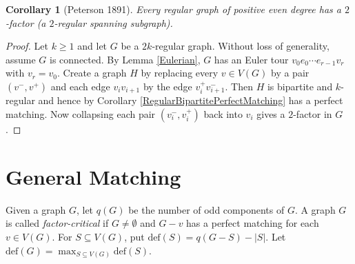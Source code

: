 \documentclass[12pt]{article}
\theoremstyle{plain}
\newtheorem{cor}[thm]{Corollary}
\theoremstyle{definition}
\theoremstyle{remark}
\newcommand{\card}[1]{\left|#1\right|}
\newcommand{\defic}[1]{\text{def}(#1)}
\begin{document}
\begin{cor}[Peterson 1891]
Every regular graph of positive even degree has a $2$-factor (a $2$-regular spanning subgraph).
\end{cor}
\begin{proof}
Let $k \geq 1$ and let $G$ be a $2k$-regular graph.  Without loss of generality, assume $G$ is connected.  By Lemma \ref{Eulerian}, $G$ has an Euler tour $v_0e_0\cdots e_{r-1}v_{r}$ with $v_r = v_0$.  Create a graph $H$ by replacing every $v \in V(G)$ by a pair $(v^-, v^+)$ and each edge $v_iv_{i+1}$ by the edge $v_i^+v_{i+1}^-$.  Then $H$ is bipartite and $k$-regular and hence by Corollary \ref{RegularBipartitePerfectMatching} has a perfect matching.  Now collapsing each pair $(v_i^-, v_i^+)$ back into $v_i$ gives a $2$-factor in $G$.
\end{proof}

\section{General Matching}
Given a graph $G$, let $q(G)$ be the number of odd components of $G$.  A graph $G$ is called \emph{factor-critical} if $G \neq \emptyset$ and $G-v$ has a perfect matching for each $v \in V(G)$.  For $S \subseteq V(G)$, put $\defic{S} = q(G - S) - \card{S}$.  Let $\defic{G} = \max_{S \subseteq V(G)} \defic{S}$.
\end{document}
